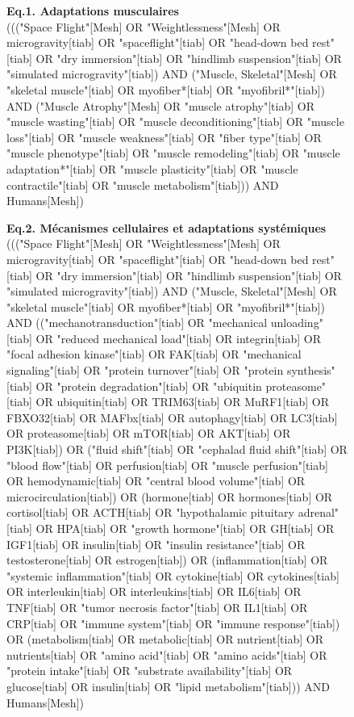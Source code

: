 \documentclass[11pt]{report}
\begin{document}
\begin{figure}[h!]
	\centering
	
	\begin{tcolorbox}[colback=gray!3,colframe=gray!50, width=0.95\textwidth]
		
		\footnotesize
		
		\textbf{Eq.1. Adaptations musculaires} \\
		((("Space Flight"[Mesh] OR "Weightlessness"[Mesh] OR microgravity[tiab] OR "spaceflight"[tiab] OR "head-down bed rest"[tiab] OR "dry immersion"[tiab] OR "hindlimb suspension"[tiab] OR "simulated microgravity"[tiab]) 
		AND 
		("Muscle, Skeletal"[Mesh] OR "skeletal muscle"[tiab] OR myofiber*[tiab] OR "myofibril*"[tiab]) 
		AND 
		("Muscle Atrophy"[Mesh] OR "muscle atrophy"[tiab] OR "muscle wasting"[tiab] OR "muscle deconditioning"[tiab] OR "muscle loss"[tiab] OR "muscle weakness"[tiab] OR "fiber type"[tiab] OR "muscle phenotype"[tiab] OR "muscle remodeling"[tiab] OR "muscle adaptation*"[tiab] OR "muscle plasticity"[tiab] OR "muscle contractile"[tiab] OR "muscle metabolism"[tiab]))
		AND Humans[Mesh])
		
		\vspace{0.5em}
		
		\textbf{Eq.2. Mécanismes cellulaires et adaptations systémiques} \\
		((("Space Flight"[Mesh] OR "Weightlessness"[Mesh] OR microgravity[tiab] OR "spaceflight"[tiab] OR "head-down bed rest"[tiab] OR "dry immersion"[tiab] OR "hindlimb suspension"[tiab] OR "simulated microgravity"[tiab]) 
		AND
		("Muscle, Skeletal"[Mesh] OR "skeletal muscle"[tiab] OR myofiber*[tiab] OR "myofibril*"[tiab]) 
		AND
		(("mechanotransduction"[tiab] OR "mechanical unloading"[tiab] OR "reduced mechanical load"[tiab] OR integrin[tiab] OR "focal adhesion kinase"[tiab] OR FAK[tiab] OR "mechanical signaling"[tiab] OR "protein turnover"[tiab] OR "protein synthesis"[tiab] OR "protein degradation"[tiab] OR "ubiquitin proteasome"[tiab] OR ubiquitin[tiab] OR TRIM63[tiab] OR MuRF1[tiab] OR FBXO32[tiab] OR MAFbx[tiab] OR autophagy[tiab] OR LC3[tiab] OR proteasome[tiab] OR mTOR[tiab] OR AKT[tiab] OR PI3K[tiab])
		OR 
		("fluid shift"[tiab] OR "cephalad fluid shift"[tiab] OR "blood flow"[tiab] OR perfusion[tiab] OR "muscle perfusion"[tiab] OR hemodynamic[tiab] OR "central blood volume"[tiab] OR microcirculation[tiab])
		OR
		(hormone[tiab] OR hormones[tiab] OR cortisol[tiab] OR ACTH[tiab] OR "hypothalamic pituitary adrenal"[tiab] OR HPA[tiab] OR "growth hormone"[tiab] OR GH[tiab] OR IGF1[tiab] OR insulin[tiab] OR "insulin resistance"[tiab] OR testosterone[tiab] OR estrogen[tiab])
		OR
		(inflammation[tiab] OR "systemic inflammation"[tiab] OR cytokine[tiab] OR cytokines[tiab] OR interleukin[tiab] OR interleukins[tiab] OR IL6[tiab] OR TNF[tiab] OR "tumor necrosis factor"[tiab] OR IL1[tiab] OR CRP[tiab] OR "immune system"[tiab] OR "immune response"[tiab])
		OR
		(metabolism[tiab] OR metabolic[tiab] OR nutrient[tiab] OR nutrients[tiab] OR "amino acid"[tiab] OR "amino acids"[tiab] OR "protein intake"[tiab] OR "substrate availability"[tiab] OR glucose[tiab] OR insulin[tiab] OR "lipid metabolism"[tiab]))
		AND Humans[Mesh])
		

\end{tcolorbox}
\end{figure}
\end{document}
